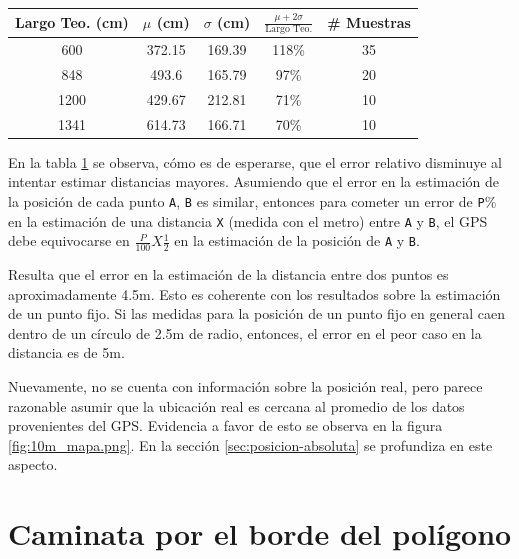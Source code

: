 \documentclass[main]{subfiles}
\begin{document}
\begin{table}[H]
\vspace{-10pt}
\begin{center}
\begin{tabular}{|c|c|c|c|c|}
\hline
\textbf{Largo Teo. (cm)} & $\mu$ (cm) & $\sigma$ (cm)  & $\frac{\mu + 2\sigma}{\text{Largo Teo.}}$ & \textbf{\# Muestras} \\
\hline
\rowcolor[gray]{0.9}
600 & 372.15 & 169.39 & 118\% & 35\\
\hline
\rowcolor[gray]{0.8}
848 & 493.6 & 165.79 & 97\%& 20\\
\hline
\rowcolor[gray]{0.9}
1200 & 429.67 & 212.81 & 71\% & 10\\
\hline
\rowcolor[gray]{0.8}
1341 & 614.73 & 166.71 & 70\% & 10\\
\hline
\end{tabular}
\caption{}
\label{tab:err-rectas}
\end{center}
\vspace{-30pt}
\end{table}

En la tabla \ref{tab:err-rectas} se observa, cómo es de esperarse, que el error relativo disminuye al intentar estimar distancias mayores. Asumiendo que el error en la estimación de la posición de cada punto \verb+A+, \verb+B+ es similar, entonces para cometer un error de \verb+P+\% en la estimación de una distancia \verb+X+ (medida con el metro) entre \verb+A+ y \verb+B+, el GPS debe equivocarse en $\frac{P}{100}X\frac{1}{2}$ en la estimación de la posición de \verb+A+ y \verb+B+.

Resulta que el error en la estimación de la distancia entre dos puntos es aproximadamente 4.5m. Esto es coherente con los resultados sobre la estimación de un punto fijo. Si las medidas para la posición de un punto fijo en general caen dentro de un círculo de 2.5m de radio, entonces, el error en el peor caso en la distancia es de 5m.

Nuevamente, no se cuenta con información sobre la posición real, pero parece razonable asumir que la ubicación real es cercana al promedio de los datos provenientes del GPS. Evidencia a favor de esto se observa en la figura \ref{fig:10m_mapa.png}. En la sección \ref{sec:posicion-absoluta} se profundiza en este aspecto.

\vspace{-20pt}
\section{Caminata por el borde del polígono}
\label{sec:caminata-por-el-borde-del-poligono}
\end{document}
